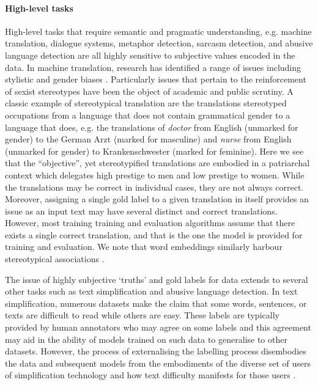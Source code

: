 \paragraph{High-level tasks} High-level tasks that require semantic and pragmatic understanding, e.g. machine translation, dialogue systems, metaphor detection, sarcasm detection, and abusive language detection are all highly sensitive to subjective values encoded in the data. In machine translation, research has identified a range of issues including stylistic \cite{Hovy:2020} and gender biases \cite{Vanmassenhove:2018}. Particularly issues that pertain to the reinforcement of sexist stereotypes have been the object of academic \cite{Escuda:2019} and public \cite{Locklear:2018} scrutiny. A classic example of stereotypical translation are the translations stereotyped occupations from a language that does not contain grammatical gender to a language that does, e.g. the translations of \textit{doctor} from English (unmarked for gender) to the German Arzt (marked for masculine) and \textit{nurse} from English (unmarked for gender) to Krankenschwester (marked for feminine). Here we see that the ``objective'', yet stereotypified translations are embodied in a patriarchal context which delegates high prestige to men and low prestige to women. While the translations may be correct in individual cases, they are not always correct. Moreover, assigning a single gold label to a given translation in itself provides an issue as an input text may have several distinct and correct translations. However, most training training and evaluation algorithms assume that there exists a single correct translation, and that is the one the model is provided for training and evaluation. We note that word embeddings similarly harbour stereotypical associations \cite{Bolukbasi:2016}.


The issue of highly subjective `truths' and gold labels for data extends to several other tasks such as text simplification and abusive language detection. In text simplification, numerous datasets make the claim that some words, sentences, or texts are difficult to read while others are easy. These labels are typically provided by human annotators who may agree on some labels and this agreement may aid in the ability of models trained on such data to generalise to other datasets. However, the process of externalising the labelling process disembodies the data and subsequent models from the embodiments of the diverse set of users of simplification technology and how text difficulty manifests for those users \cite{Bingel:2018}.

